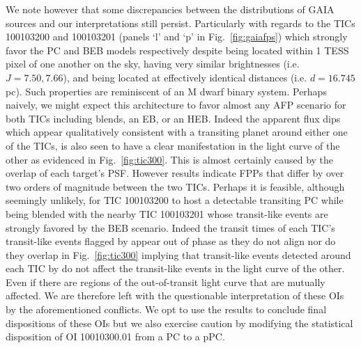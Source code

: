 We note however that some discrepancies between the distributions of GAIA sources and our \vespa{}
interpretations still persist. Particularly with regards to the TICs 100103200 and 100103201 (panels `l'
and `p' in Fig.~\ref{fig:gaiafps}) which strongly favor the PC and BEB models respectively despite being
located within 1 TESS pixel of one another on the sky, having very
similar brightnesses (i.e. $J=7.50, 7.66$), and being located at effectively identical distances (i.e.
$d=16.745$ pc). Such properties are reminiscent of an M dwarf binary system.
Perhaps naively, we might expect this architecture to favor almost any AFP scenario for
both TICs including blends, an EB, or an HEB. Indeed the apparent flux dips which appear qualitatively
consistent with a transiting planet around either one of the TICs, is also seen to have a clear manifestation
in the light curve of the other as evidenced in Fig.~\ref{fig:tic300}. This is almost certainly caused by the
overlap of each target's PSF.
However \vespa{} results indicate FPPs that differ by over two orders of magnitude between the two TICs.
Perhaps it is feasible, although seemingly unlikely, for TIC 100103200 to host a detectable transiting
PC while being blended with the nearby TIC 100103201 whose transit-like events are strongly favored by the
BEB scenario. Indeed the transit times of each TIC's transit-like events flagged by \pipeline{} appear out of
phase as they do not align nor do they overlap in Fig.~\ref{fig:tic300} implying that transit-like events detected
around each TIC by \pipeline{} do not affect the transit-like events in the light curve of the other. Even if
there are regions of the out-of-transit light curve that are mutually affected.
We are therefore left with the questionable interpretation
of these OIs by the aforementioned conflicts. We opt to use the \vespa{} results to conclude final
dispositions of these OIs but we also exercise caution by modifying the statistical disposition of
OI 10010300.01 from a PC to a pPC.

